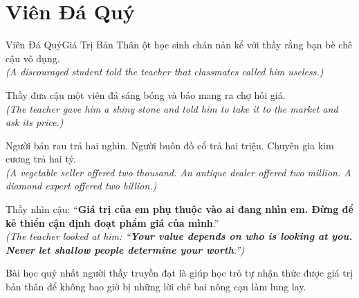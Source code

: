 \section{Viên Đá Quý}
\begin{truyen}{Viên Đá Quý}{Giá Trị Bản Thân}
ột học sinh chán nản kể với thầy rằng bạn bè chê cậu vô dụng.\\
\textit{(A discouraged student told the teacher that classmates called him useless.)}

Thầy đưa cậu một viên đá sáng bóng và bảo mang ra chợ hỏi giá.\\
\textit{(The teacher gave him a shiny stone and told him to take it to the market and ask its price.)}

Người bán rau trả hai nghìn. Người buôn đồ cổ trả hai triệu. Chuyên gia kim cương trả hai tỷ.\\
\textit{(A vegetable seller offered two thousand. An antique dealer offered two million. A diamond expert offered two billion.)}

Thầy nhìn cậu: ``\textbf{Giá trị của em phụ thuộc vào ai đang nhìn em. Đừng để kẻ thiển cận định đoạt phẩm giá của mình}.''\\
\textit{(The teacher looked at him: ``\textbf{Your value depends on who is looking at you. Never let shallow people determine your worth}.'')}
\end{truyen}
\begin{baihoc}
  Bài học quý nhất người thầy truyền đạt là giúp học trò tự nhận thức được giá trị bản thân để không bao giờ bị những lời chê bai nông cạn làm lung lay.
\end{baihoc}

